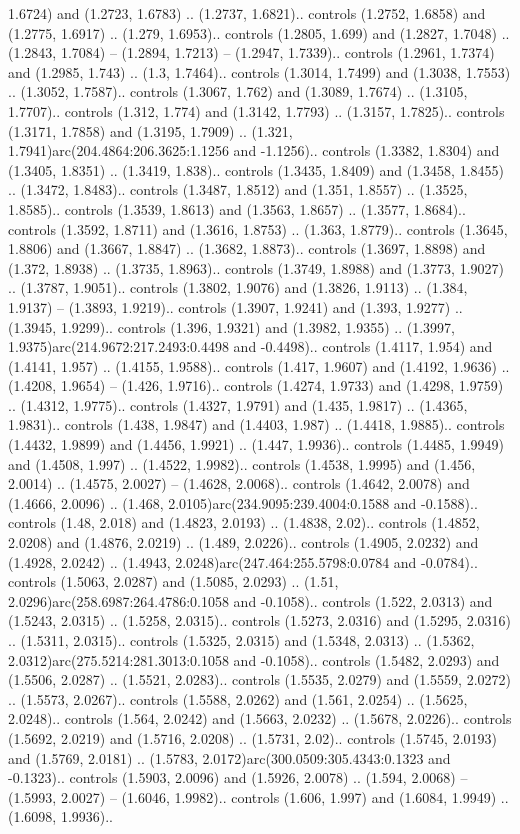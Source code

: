 1.6724) and (1.2723, 1.6783) .. (1.2737, 1.6821).. controls (1.2752, 1.6858) and (1.2775, 1.6917) .. (1.279, 1.6953).. controls (1.2805, 1.699) and (1.2827, 1.7048) .. (1.2843, 1.7084) -- (1.2894, 1.7213) -- (1.2947, 1.7339).. controls (1.2961, 1.7374) and (1.2985, 1.743) .. (1.3, 1.7464).. controls (1.3014, 1.7499) and (1.3038, 1.7553) .. (1.3052, 1.7587).. controls (1.3067, 1.762) and (1.3089, 1.7674) .. (1.3105, 1.7707).. controls (1.312, 1.774) and (1.3142, 1.7793) .. (1.3157, 1.7825).. controls (1.3171, 1.7858) and (1.3195, 1.7909) .. (1.321, 1.7941)arc(204.4864:206.3625:1.1256 and -1.1256).. controls (1.3382, 1.8304) and (1.3405, 1.8351) .. (1.3419, 1.838).. controls (1.3435, 1.8409) and (1.3458, 1.8455) .. (1.3472, 1.8483).. controls (1.3487, 1.8512) and (1.351, 1.8557) .. (1.3525, 1.8585).. controls (1.3539, 1.8613) and (1.3563, 1.8657) .. (1.3577, 1.8684).. controls (1.3592, 1.8711) and (1.3616, 1.8753) .. (1.363, 1.8779).. controls (1.3645, 1.8806) and (1.3667, 1.8847) .. (1.3682, 1.8873).. controls (1.3697, 1.8898) and (1.372, 1.8938) .. (1.3735, 1.8963).. controls (1.3749, 1.8988) and (1.3773, 1.9027) .. (1.3787, 1.9051).. controls (1.3802, 1.9076) and (1.3826, 1.9113) .. (1.384, 1.9137) -- (1.3893, 1.9219).. controls (1.3907, 1.9241) and (1.393, 1.9277) .. (1.3945, 1.9299).. controls (1.396, 1.9321) and (1.3982, 1.9355) .. (1.3997, 1.9375)arc(214.9672:217.2493:0.4498 and -0.4498).. controls (1.4117, 1.954) and (1.4141, 1.957) .. (1.4155, 1.9588).. controls (1.417, 1.9607) and (1.4192, 1.9636) .. (1.4208, 1.9654) -- (1.426, 1.9716).. controls (1.4274, 1.9733) and (1.4298, 1.9759) .. (1.4312, 1.9775).. controls (1.4327, 1.9791) and (1.435, 1.9817) .. (1.4365, 1.9831).. controls (1.438, 1.9847) and (1.4403, 1.987) .. (1.4418, 1.9885).. controls (1.4432, 1.9899) and (1.4456, 1.9921) .. (1.447, 1.9936).. controls (1.4485, 1.9949) and (1.4508, 1.997) .. (1.4522, 1.9982).. controls (1.4538, 1.9995) and (1.456, 2.0014) .. (1.4575, 2.0027) -- (1.4628, 2.0068).. controls (1.4642, 2.0078) and (1.4666, 2.0096) .. (1.468, 2.0105)arc(234.9095:239.4004:0.1588 and -0.1588).. controls (1.48, 2.018) and (1.4823, 2.0193) .. (1.4838, 2.02).. controls (1.4852, 2.0208) and (1.4876, 2.0219) .. (1.489, 2.0226).. controls (1.4905, 2.0232) and (1.4928, 2.0242) .. (1.4943, 2.0248)arc(247.464:255.5798:0.0784 and -0.0784).. controls (1.5063, 2.0287) and (1.5085, 2.0293) .. (1.51, 2.0296)arc(258.6987:264.4786:0.1058 and -0.1058).. controls (1.522, 2.0313) and (1.5243, 2.0315) .. (1.5258, 2.0315).. controls (1.5273, 2.0316) and (1.5295, 2.0316) .. (1.5311, 2.0315).. controls (1.5325, 2.0315) and (1.5348, 2.0313) .. (1.5362, 2.0312)arc(275.5214:281.3013:0.1058 and -0.1058).. controls (1.5482, 2.0293) and (1.5506, 2.0287) .. (1.5521, 2.0283).. controls (1.5535, 2.0279) and (1.5559, 2.0272) .. (1.5573, 2.0267).. controls (1.5588, 2.0262) and (1.561, 2.0254) .. (1.5625, 2.0248).. controls (1.564, 2.0242) and (1.5663, 2.0232) .. (1.5678, 2.0226).. controls (1.5692, 2.0219) and (1.5716, 2.0208) .. (1.5731, 2.02).. controls (1.5745, 2.0193) and (1.5769, 2.0181) .. (1.5783, 2.0172)arc(300.0509:305.4343:0.1323 and -0.1323).. controls (1.5903, 2.0096) and (1.5926, 2.0078) .. (1.594, 2.0068) -- (1.5993, 2.0027) -- (1.6046, 1.9982).. controls (1.606, 1.997) and (1.6084, 1.9949) .. (1.6098, 1.9936).. 